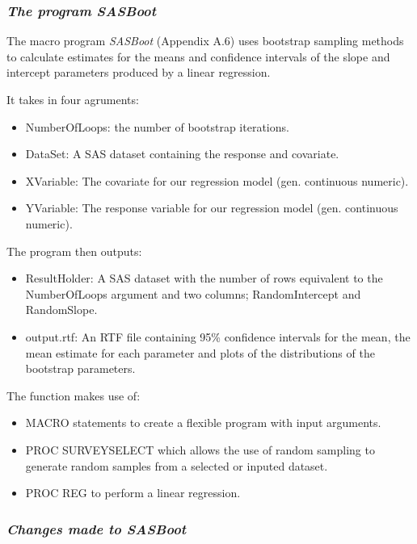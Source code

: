 \documentclass[]{article}
\providecommand{\tightlist}{%
  \setlength{\itemsep}{0pt}\setlength{\parskip}{0pt}}
\begin{document}
\subsubsection{\texorpdfstring{\emph{The program
SASBoot}}{The program SASBoot}}\label{the-program-sasboot}

The macro program \emph{SASBoot} (Appendix A.6) uses bootstrap sampling
methods to calculate estimates for the means and confidence intervals of
the slope and intercept parameters produced by a linear regression.

It takes in four agruments:

\begin{itemize}
\tightlist
\item
  NumberOfLoops: the number of bootstrap iterations.
\item
  DataSet: A SAS dataset containing the response and covariate.
\item
  XVariable: The covariate for our regression model (gen. continuous
  numeric).
\item
  YVariable: The response variable for our regression model (gen.
  continuous numeric).
\end{itemize}

The program then outputs:

\begin{itemize}
\tightlist
\item
  ResultHolder: A SAS dataset with the number of rows equivalent to the
  NumberOfLoops argument and two columns; RandomIntercept and
  RandomSlope.
\item
  output.rtf: An RTF file containing 95\% confidence intervals for the
  mean, the mean estimate for each parameter and plots of the
  distributions of the bootstrap parameters.
\end{itemize}

The function makes use of:

\begin{itemize}
\tightlist
\item
  MACRO statements to create a flexible program with input arguments.
\item
  PROC SURVEYSELECT which allows the use of random sampling to generate
  random samples from a selected or inputed dataset.
\item
  PROC REG to perform a linear regression.
\end{itemize}

\subsubsection{\texorpdfstring{\emph{Changes made to
SASBoot}}{Changes made to SASBoot}}\label{changes-made-to-sasboot}
\end{document}
